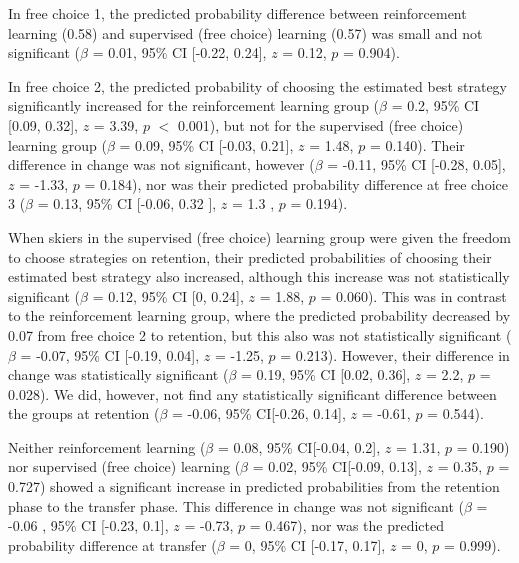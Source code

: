 In free choice 1, the predicted probability difference between reinforcement learning (0.58) and supervised (free choice) learning (0.57) was small and not significant ($\beta$ = 0.01, 95\% CI [-0.22, 0.24], $z$ = 0.12, $p$ = 0.904). 

In free choice 2, the predicted probability of choosing the estimated best strategy significantly increased for the reinforcement learning group ($\beta$ = 0.2, 95\% CI [0.09, 0.32], $z$ = 3.39, $p$  $<$ 0.001), but not for the supervised (free choice) learning group ($\beta$ = 0.09, 95\% CI [-0.03, 0.21], $z$ = 1.48, $p$ = 0.140). Their difference in change was not significant, however ($\beta$ = -0.11, 95\% CI [-0.28, 0.05], $z$ = -1.33, $p$ = 0.184), nor was their predicted probability difference at free choice 3 ($\beta$ = 0.13, 95\% CI [-0.06, 0.32 ], $z$ = 1.3 , $p$  =  0.194).

When skiers in the supervised (free choice) learning group were given the freedom to choose strategies on retention, their predicted probabilities of choosing their estimated best strategy also increased, although this increase was not statistically significant ($\beta$ = 0.12, 95\% CI [0, 0.24], $z$ = 1.88, $p$ = 0.060). This was in contrast to the reinforcement learning group, where the predicted probability decreased by 0.07 from free choice 2 to retention, but this also was not statistically significant ($\beta$ = -0.07, 95\% CI [-0.19, 0.04], $z$ = -1.25, $p$ = 0.213). However, their difference in change was statistically significant ($\beta$ = 0.19, 95\% CI [0.02, 0.36], $z$ = 2.2, $p$ = 0.028). We did, however,  not find any statistically significant difference between the groups at retention ($\beta$ = -0.06, 95\% CI[-0.26, 0.14], $z$ = -0.61, $p$ = 0.544).

Neither reinforcement learning ($\beta$ = 0.08, 95\% CI[-0.04, 0.2], $z$ = 1.31, $p$ = 0.190) nor supervised (free choice) learning ($\beta$ = 0.02, 95\% CI[-0.09, 0.13], $z$ = 0.35, $p$ = 0.727) showed a significant increase in predicted probabilities from the retention phase to the transfer phase. This difference in change was not significant ($\beta$ = -0.06 , 95\% CI [-0.23, 0.1], $z$ = -0.73, $p$ = 0.467), nor was the predicted probability difference at transfer ($\beta$ = 0, 95\% CI [-0.17, 0.17], $z$ = 0, $p$ = 0.999).

